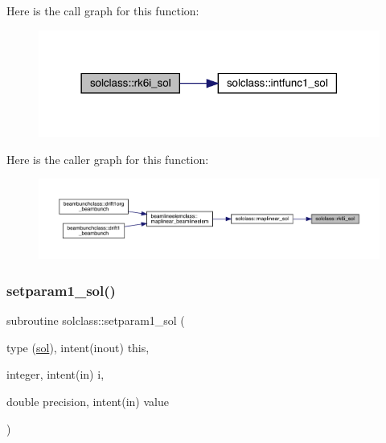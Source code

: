 Here is the call graph for this function\+:\nopagebreak
\begin{figure}[H]
\begin{center}
\leavevmode
\includegraphics[width=318pt]{namespacesolclass_ae384372c54c045759b9bb9e1eb0886a1_cgraph}
\end{center}
\end{figure}
Here is the caller graph for this function\+:\nopagebreak
\begin{figure}[H]
\begin{center}
\leavevmode
\includegraphics[width=350pt]{namespacesolclass_ae384372c54c045759b9bb9e1eb0886a1_icgraph}
\end{center}
\end{figure}
\mbox{\label{namespacesolclass_aaec011d4f25d3b03a7e0b42beaa7c9db}} 
\subsubsection{\texorpdfstring{setparam1\_sol()}{setparam1\_sol()}}
{\footnotesize\ttfamily subroutine solclass\+::setparam1\+\_\+sol (\begin{DoxyParamCaption}\item[{type (\mbox{\hyperlink{namespacesolclass_structsolclass_1_1sol}{sol}}), intent(inout)}]{this,  }\item[{integer, intent(in)}]{i,  }\item[{double precision, intent(in)}]{value }\end{DoxyParamCaption})}

\mbox{\label{namespacesolclass_a8f2eac99c954759e1b3b6094d8f502fb}} 
